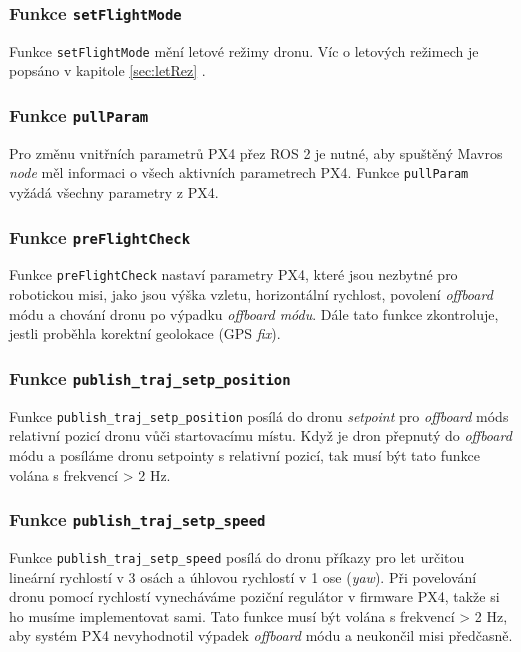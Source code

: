 \subsubsection{Funkce \texttt{setFlightMode}}

Funkce \texttt{setFlightMode} mění letové režimy dronu. Víc o letových režimech je popsáno v kapitole \ref{sec:letRez} .

\subsubsection{Funkce \texttt{pullParam}}

Pro změnu vnitřních parametrů PX4 přez ROS 2 je nutné, aby spuštěný Mavros \textit{node} měl informaci o všech aktivních parametrech PX4. Funkce \texttt{pullParam} vyžádá všechny parametry z PX4.

\subsubsection{Funkce \texttt{preFlightCheck}}

Funkce \texttt{preFlightCheck} nastaví parametry PX4, které jsou nezbytné pro robotickou misi, jako jsou výška vzletu, horizontální rychlost, povolení \textit{offboard} módu a chování dronu po výpadku \textit{offboard módu}. Dále tato funkce zkontroluje, jestli proběhla korektní geolokace (GPS \textit{fix}).

\subsubsection{Funkce \texttt{publish\_traj\_setp\_position}}

Funkce \texttt{publish\_traj\_setp\_position} posílá do dronu \textit{setpoint} pro \textit{offboard} mód\break s relativní pozicí dronu vůči startovacímu místu. Když je dron přepnutý do \textit{offboard} módu a posíláme dronu setpointy s relativní pozicí, tak musí být tato funkce volána s frekvencí > 2 Hz.

\subsubsection{Funkce \texttt{publish\_traj\_setp\_speed}}

Funkce \texttt{publish\_traj\_setp\_speed} posílá do dronu příkazy pro let určitou lineární rychlostí v 3 osách a úhlovou rychlostí v 1 ose (\textit{yaw}). Při povelování dronu pomocí rychlostí vynecháváme poziční regulátor v firmware PX4, takže si ho musíme implementovat sami. Tato funkce musí být volána s frekvencí > 2 Hz, aby systém PX4 nevyhodnotil výpadek \textit{offboard} módu a neukončil misi předčasně.

